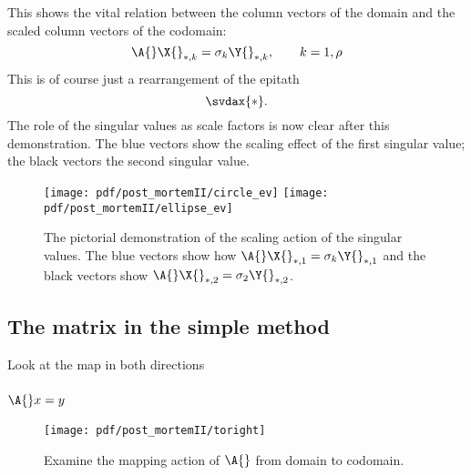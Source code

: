 \begin{table}[htdp]
\begin{center}
\end{center}
\label{tab:pmII:blackblue}
\caption{The eigenvectors of the domain and codomain and the scaling action of the eigenvectors.}
\end{table}%

This shows the vital relation between the column vectors of the domain and the scaled column vectors of the codomain:
\begin{equation}
  \A{} \X{}_{*,k} = \sigma_{k}\Y{}_{*,k}, \qquad k=1,\rho
  \label{eq:pmII:vital}
\end{equation}
This is of course just a rearrangement of the epitath
$$
\svdax{*}.
$$
The role of the singular values as scale factors is now clear after this demonstration. The blue vectors show the scaling effect of the first singular value; the black vectors the second singular value.

\begin{figure}[htbp] %
   \centering
   \texttt{[image: pdf/post\_mortemII/circle\_ev]} \qquad
   \texttt{[image: pdf/post\_mortemII/ellipse\_ev]} 
   \caption[The scaling action of the singular values]{The pictorial demonstration of the scaling action of the singular values. The blue vectors show how $\A{} \X{}_{*,1} = \sigma_{k}\Y{}_{*,1}$ and the black vectors show $\A{} \X{}_{*,2} = \sigma_{2}\Y{}_{*,2}$.}
   \label{fig:maps:ev}
\end{figure}

\subsection{The matrix in the simple method}
Look at the map in both directions

\subsubsection{$\A{}x=y$}
\begin{figure}[htbp] %
   \centering
   \texttt{[image: pdf/post\_mortemII/toright]} 
   \caption{Examine the mapping action of $\A{}$ from domain to codomain.}
   \label{fig:toright}
\end{figure}

